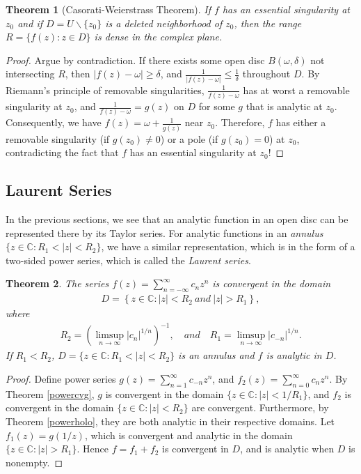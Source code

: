 \documentclass{article}
\numberwithin{equation}{section}
\newcommand{\bbC}{\mathbb{C}}
\theoremstyle{plain}
\newtheorem{theorem}{Theorem}[section]
\theoremstyle{definition}
\begin{document}
\begin{theorem}[Casorati-Weierstrass Theorem]
If $f$ has an essential singularity at $z_0$ and if $D=U\backslash\{z_0\}$ is a deleted neighborhood of $z_0$, then the range $R=\{f(z):z\in D\}$ is dense in the complex plane.
\end{theorem}
\begin{proof}
Argue by contradiction. If there exists some open disc $B(\omega,\delta)$ not intersecting $R$, then $\vert f(z)-\omega\vert\geq\delta$, and $\frac{1}{\vert f(z)-\omega\vert}\leq\frac{1}{\delta}$ throughout $D$. By Riemann's principle of removable singularities, $\frac{1}{f(z)-\omega}$ has at worst a removable singularity at $z_0$, and $\frac{1}{f(z)-\omega}=g(z)$ on $D$ for some $g$ that is analytic at $z_0$. Consequently, we have $f(z)=\omega+\frac{1}{g(z)}$ near $z_0$. Therefore, $f$ has either a removable singularity (if $g(z_0)\neq 0$) or a pole (if $g(z_0)=0$) at $z_0$, contradicting the fact that $f$ has an essential singularity at $z_0$!
\end{proof}

\subsection{Laurent Series}
In the previous sections, we see that an analytic function in an open disc can be represented there by its Taylor series. For analytic functions in an \textit{annulus} $\{z\in\bbC:R_1<\vert z\vert<R_2\}$, we have a similar representation, which is in the form of a two-sided power series, which is called the \textit{Laurent series}.
\begin{theorem}
The series $f(z)=\sum_{n=-\infty}^\infty c_nz^n$ is convergent in the domain
\begin{align*}
	D=\left\{z\in\bbC:\vert z\vert<R_2\ and\ \vert z\vert>R_1\right\},
\end{align*}
where
\begin{align*}
	R_2=\left(\limsup_{n\to\infty}\vert c_n\vert^{1/n}\right)^{-1},\quad and\quad R_1=\limsup_{n\to\infty}\vert c_{-n}\vert^{1/n}.
\end{align*}
If $R_1<R_2$, $D=\{z\in\bbC:R_1<\vert z\vert<R_2\}$ is an annulus and $f$ is analytic in $D$.
\end{theorem}
\begin{proof}
Define power series $g(z)=\sum_{n=1}^\infty c_{-n}z^n$, and $f_2(z)=\sum_{n=0}^\infty c_nz^n$. By Theorem \ref{powercvg}, $g$ is convergent in the domain $\{z\in\bbC:\vert z\vert<1/R_1\}$, and $f_2$ is convergent in the domain $\{z\in\bbC:\vert z\vert<R_2\}$ are convergent. Furthermore, by Theorem \ref{powerholo}, they are both analytic in their respective domains. Let $f_1(z)=g(1/z)$, which is convergent and analytic in the domain $\{z\in\bbC:\vert z\vert>R_1\}$. Hence $f=f_1+f_2$ is convergent in $D$, and is analytic when $D$ is nonempty.
\end{proof}
\end{document}
